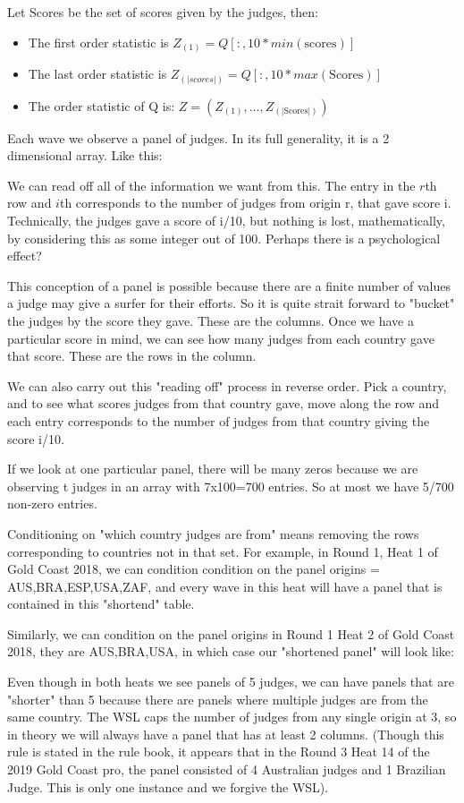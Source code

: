 \documentclass{article}
\begin{document}
Let Scores be the set of scores given by the judges, then:
\begin{itemize}
\item The first order statistic is $Z_{(1)} = Q[:,10*min(\text{scores})]$
\item The last order statistic is $Z_{(|scores|)} = Q[:,10*max(\text{Scores})]$
\item The order statistic of Q is: $Z = (Z_{(1)},\dots, Z_{(|\text{Scores}|)}) $
\end{itemize}

Each wave we observe a panel of judges. In its full generality, it is a 2 dimensional array. Like this:

We can read off all of the information we want from this. The entry in the $r$th row and $i$th corresponds to the number of judges from origin r, that gave score i. Technically, the judges gave a score of i/10, but nothing is lost, mathematically, by considering this as some integer out of 100. Perhaps there is a psychological effect?

This conception of a panel is possible because there are a finite number of values a judge may give a surfer for their efforts. So it is quite strait forward to "bucket" the judges by the score they gave. These are the columns. Once we have a particular score in mind, we can see how many judges from each country gave that score. These are the rows in the column.

We can also carry out this "reading off" process in reverse order. Pick a country, and to see what scores judges from that country gave, move along the row and each entry corresponds to the number of judges from that country giving the score i/10.

If we look at one particular panel, there will be many zeros because we are observing t judges in an array with 7x100=700 entries. So at most we have 5/700 non-zero entries.

Conditioning on "which country judges are from" means removing the rows corresponding to countries not in that set. For example, in Round 1, Heat 1 of Gold Coast 2018, we can condition condition on the panel origins = {AUS,BRA,ESP,USA,ZAF}, and every wave in this heat will have a panel that is contained in this "shortend" table. 

Similarly, we can condition on the panel origins in Round 1 Heat 2 of Gold Coast 2018, they are {AUS,BRA,USA}, in which case our "shortened panel" will look like:

Even though in both heats we see panels of 5 judges, we can have panels that are "shorter" than 5 because there are panels where multiple judges are from the same country. The WSL caps the number of judges from any single origin at 3, so in theory we will always have a panel that has at least 2 columns. (Though this rule is stated in the rule book, it appears that in the Round 3 Heat 14 of the 2019 Gold Coast pro, the panel consisted of 4 Australian judges and 1 Brazilian Judge. This is only one instance and we forgive the WSL).
\end{document}
